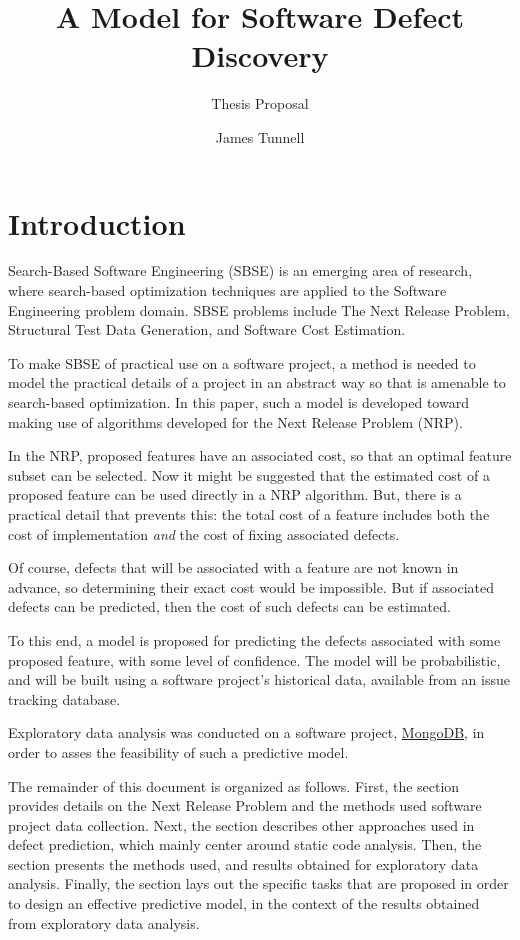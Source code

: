 \documentclass[a4paper]{scrartcl}
\begin{document}
\title{A Model for Software Defect Discovery}
\subtitle{Thesis Proposal}
\author{James Tunnell}
\maketitle

\section{Introduction}
Search-Based Software Engineering (SBSE) is an emerging area of research, where search-based optimization techniques are applied to the Software Engineering problem domain. SBSE problems include The Next Release Problem, Structural Test Data Generation, and Software Cost Estimation\cite{2012_harman_search}.

To make SBSE of practical use on a software project, a method is needed to model the practical details of a project in an abstract way so that is amenable to search-based optimization. In this paper, such a model is developed toward making use of algorithms developed for the Next Release Problem (NRP).

In the NRP, proposed features have an associated cost, so that an optimal feature subset can be selected. Now it might be suggested that the estimated cost of a proposed feature can be used directly in a NRP algorithm. But, there is a practical detail that prevents this: the total cost of a feature includes both the cost of implementation \emph{and} the cost of fixing associated defects.

Of course, defects that will be associated with a feature are not known in advance, so determining their exact cost would be impossible. But if associated defects can be predicted, then the cost of such defects can be estimated.

To this end, a model is proposed for predicting the defects associated with some proposed feature, with some level of confidence. The model will be probabilistic, and will be built using a software project's historical data, available from an issue tracking database.

Exploratory data analysis was conducted on a software project, \href{https://www.mongodb.org}{MongoDB}, in order to asses the feasibility of such a predictive model.

The remainder of this document is organized as follows. First, the  section provides details on the Next Release Problem and the methods used software project data collection. Next, the  section describes other approaches used in defect prediction, which mainly center around static code analysis. Then, the  section presents the  methods used, and results obtained for exploratory data analysis. Finally, the  section lays out the specific tasks that are proposed in order to design an effective predictive model, in the context of the results obtained from exploratory data analysis.
\end{document}
